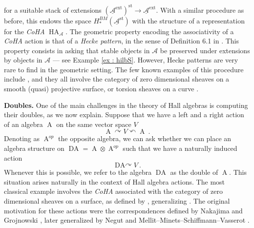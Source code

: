 \documentclass[11pt]{article}
\begin{document}
for a suitable stack of extensions $(\underline{\mathcal{A}}^{\operatorname{ext}})^{\operatorname{st}} \rightarrow \underline{\mathcal{A}}^{\operatorname{ext}}$. With a similar procedure as before, this endows the space $H^{BM}_*(\underline{\mathcal{A}}^{\operatorname{st}})$ with the structure of a representation for the \textit{CoHA} $\operatorname{HA}_{\mathcal{A}}$. The geometric property encoding the associativity of a \textit{CoHA} action is that of a \textit{Hecke pattern}, in the sense of Definition 6.1 in \cite{mmsv23}. This property consists in asking that stable objects in $\mathcal{A}$ be preserved under extensions by objects in $\mathcal{A}$ --- see Example \ref{ex : hilbS}. However, Hecke patterns are very rare to find in the geometric setting. The few known examples of this procedure include \cite{mmsv23, Minets_2020, neguţ2022heckecorrespondencessmoothmoduli, dps, hausel2025pwmathcalh2, diaconescuhallalgebrasonedimensional}, and they all involve the category of zero dimensional sheaves on a smooth (quasi) projective surface, or torsion sheaves on a curve \cite{marian2026cohomologyquotschemesmooth, kaushik2026cohomologyhyperquotschemescurves}. \newline 


\noindent\textbf{Doubles. }One of the main challenges in the theory of Hall algebras is computing their doubles, as we now explain. Suppose that we have a left and a right action of an algebra $\operatorname{A}$ on the same vector space $V$
\begin{equation}\label{leftright}
    \operatorname{A} \curvearrowright V \curvearrowleft \operatorname{A} \ . 
\end{equation}
Denoting as $\operatorname{A}^{op}$ the opposite algebra, we can ask whether we can place an algebra structure on $\operatorname{DA} = \operatorname{A}\otimes \operatorname{A}^{op}$ such that we have a naturally induced action
\begin{equation}\label{double action}
    \operatorname{DA \curvearrowright} V \ .
\end{equation}
Whenever this is possible, we refer to the algebra $\operatorname{DA}$ as the double of $\operatorname{A}$. This situation arises naturally in the context of Hall algebra actions. The most classical example involves the \textit{CoHA} associated with the category of zero dimensional sheaves on a surface, as defined by \cite{kapranov2022cohomologicalhallalgebrasurface}, generalizing \cite{Minets_2020, ss20, Zhao_2020}. The original motivation for these actions were the correspondences defined by Nakajima \cite{nakajimaheisenbergalgebrahilbertschemes} and Grojnowski \cite{grojnowski1995instantonsaffinealgebrasi}, later generalized by Negut \cite{neguţ2022heckecorrespondencessmoothmoduli} and Mellit--Minets--Schiffmann--Vasserot \cite{mmsv23}. 
\end{document}
